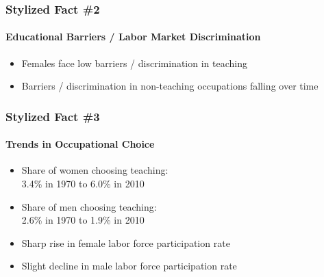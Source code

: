 \documentclass[11pt]{beamer}
\begin{document}
	\begin{frame}
		\frametitle{Stylized Fact \#2}
		\framesubtitle{Educational Barriers / Labor Market Discrimination}
		\begin{itemize}
			\item Females face low barriers / discrimination in teaching
			\item Barriers / discrimination in non-teaching occupations falling over time
		\end{itemize}
	\end{frame}
	
	\begin{frame}
		\frametitle{Stylized Fact \#3}
		\framesubtitle{Trends in Occupational Choice}
		\begin{itemize}
			\item Share of women choosing teaching: \\3.4\% in 1970 to 6.0\% in 2010
			\item Share of men choosing teaching: \\2.6\% in 1970 to 1.9\% in 2010
			\item Sharp rise in female labor force participation rate
			\item Slight decline in male labor force participation rate
		\end{itemize}
	\end{frame}
	
	
\end{document}

